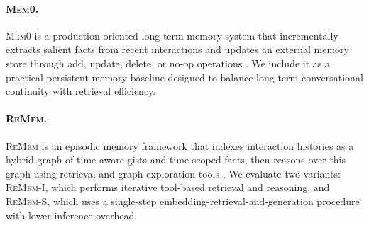 \paragraph{\textsc{Mem0}.}
\textsc{Mem0} is a production-oriented long-term memory system that incrementally extracts salient facts from recent interactions and updates an external memory store through add, update, delete, or no-op operations \citep{chhikara2025mem0}. We include it as a practical persistent-memory baseline designed to balance long-term conversational continuity with retrieval efficiency.

\paragraph{\textsc{ReMem}.}
\textsc{ReMem} is an episodic memory framework that indexes interaction histories as a hybrid graph of time-aware gists and time-scoped facts, then reasons over this graph using retrieval and graph-exploration tools \citep{shu2026remem}. We evaluate two variants: \textsc{ReMem-I}, which performs iterative tool-based retrieval and reasoning, and \textsc{ReMem-S}, which uses a single-step embedding-retrieval-and-generation procedure with lower inference overhead.
